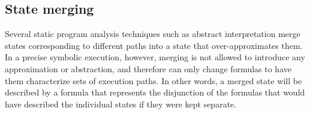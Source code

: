 \subsection{State merging}

Several static program analysis techniques such as abstract interpretation merge states corresponding to different paths into a state that over-approximates them. In a precise symbolic execution, however, merging is not allowed to introduce any approximation or abstraction, and therefore can only change formulas to have them characterize sets of execution paths. In other words, a merged state will be described by a formula that represents the disjunction of the formulas that would have described the individual states if they were kept separate.

